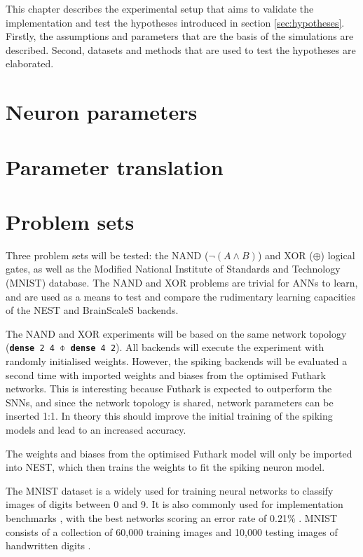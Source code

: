\documentclass[report.tex]{subfiles}
\begin{document}
This chapter describes the experimental setup that aims to validate the
implementation and test the hypotheses introduced in section \ref{sec:hypotheses}.
Firstly, the assumptions and parameters that are the basis of the simulations are described.
Second, datasets and methods that are used to test the hypotheses are
elaborated.

\section{Neuron parameters}


\section{Parameter translation} \label{sec:translation}


\section{Problem sets}
Three problem sets will be tested: the NAND ($\neg(A \land B)$) and XOR
($\oplus$) logical gates, as well as the 
Modified National Institute of Standards and Technology
(MNIST) database.
The NAND and XOR problems are trivial for \glspl{ANN} to learn, and are used as
a means to test and compare the rudimentary learning capacities of the NEST and
BrainScaleS backends.

The NAND and XOR experiments will be based on the same network topology
(\texttt{\textbf{dense} 2 4 $\obar$ \textbf{dense} 4 2}). 
All backends will execute the experiment with randomly initialised weights. However, the spiking backends will be evaluated
a second time with imported weights and biases from the optimised Futhark
networks.
This is interesting because Futhark is expected to outperform the \glspl{SNN}, and since the
network topology is shared, network parameters can be inserted 1:1.
In theory this should improve the initial training of the spiking models and
lead to an increased accuracy.

The weights and biases from the optimised Futhark model will only be imported into NEST,
which then trains the weights to fit the spiking neuron model.

The MNIST dataset is a widely used for training neural networks to classify
images of digits between 0 and 9. 
It is also commonly used for implementation benchmarks \cite{Schmidhuber2014,
Schmitt2017}, with the best networks scoring an error rate of 0.21\%
\cite{LeCun2019}.
MNIST consists of a collection of 60,000 training images and 10,000 testing images of handwritten digits \cite{LeCun1998}.
\end{document}
